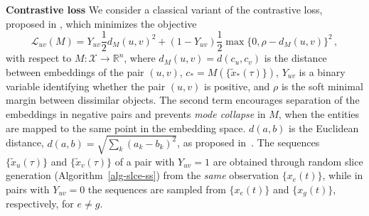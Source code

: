 \documentclass[sigconf, anonymous]{acmart}
\begin{document}


\textbf{Contrastive loss} We consider a classical variant of the contrastive loss, proposed in
\citep{Hadsell2006DimensionalityRB}, which minimizes the objective
\begin{equation*}
    \mathcal{L}_{u v}(M)
        = Y_{u v} \frac12 d_M(u, v)^2
        + (1 - Y_{u v}) \frac12\max\{0, \rho - d_M(u, v) \}^2
    \,,
\end{equation*}
with respect to $
    M \colon \mathcal{X} \to \mathbb{R}^n
$, where $
    d_M(u, v) = d(c_u, c_v)
$ is the distance between embeddings of the pair $(u, v)$, $
    c_* = M(\{\tilde{x}_*(\tau)\})
$, $Y_{u v}$ is a binary variable
identifying whether the pair $(u, v)$ is positive, and $\rho$ is the soft minimal margin between
dissimilar objects. The second term encourages separation of the embeddings in negative
pairs and prevents \emph{mode collapse} in $M$, when the entities are mapped to the same
point in the embedding space. $d(a, b)$ is the Euclidean distance, $
    d(a, b)
        = \sqrt{
            \sum_k (a_k - b_k)^2
        }
$, as proposed in~\citep{Hadsell2006DimensionalityRB}.
The sequences $\{\tilde{x}_u(\tau)\}$ and $\{\tilde{x}_v(\tau)\}$ of a pair with $Y_{u v} = 1$
are obtained through random slice generation (Algorithm~\ref{alg-slce-ss}) from the \emph{same}
observation $\{x_e(t)\}$, while in pairs with $Y_{u v} = 0$ the sequences are sampled from
$\{x_e(t)\}$ and $\{x_g(t)\}$, respectively, for $e \neq g$.
\end{document}
